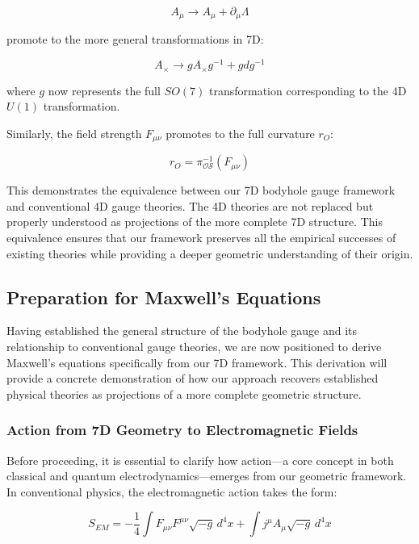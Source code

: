 \documentclass{article}
\begin{document}
\begin{equation}
A_{\mu} \rightarrow A_{\mu} + \partial_{\mu} \Lambda
\end{equation}

promote to the more general transformations in 7D:

\begin{equation}
A_{\times} \rightarrow g A_{\times} g^{-1} + g dg^{-1}
\end{equation}

where $g$ now represents the full $SO(7)$ transformation corresponding to the 4D $U(1)$ transformation.

Similarly, the field strength $F_{\mu\nu}$ promotes to the full curvature $r_O$:

\begin{equation}
r_O = \pi^{-1}_{\mathcal{OS}}(F_{\mu\nu})
\end{equation}

This demonstrates the equivalence between our 7D bodyhole gauge framework and conventional 4D gauge theories. The 4D theories are not replaced but properly understood as projections of the more complete 7D structure. This equivalence ensures that our framework preserves all the empirical successes of existing theories while providing a deeper geometric understanding of their origin.

\subsection{Preparation for Maxwell's Equations}

Having established the general structure of the bodyhole gauge and its relationship to conventional gauge theories, we are now positioned to derive Maxwell's equations specifically from our 7D framework. This derivation will provide a concrete demonstration of how our approach recovers established physical theories as projections of a more complete geometric structure.

\subsubsection{Action from 7D Geometry to Electromagnetic Fields}

Before proceeding, it is essential to clarify how action—a core concept in both classical and quantum electrodynamics—emerges from our geometric framework. In conventional physics, the electromagnetic action takes the form:

\begin{equation}
S_{EM} = -\frac{1}{4}\int F_{\mu\nu}F^{\mu\nu} \sqrt{-g} \, d^4x + \int j^\mu A_\mu \sqrt{-g} \, d^4x
\end{equation}
\end{document}
